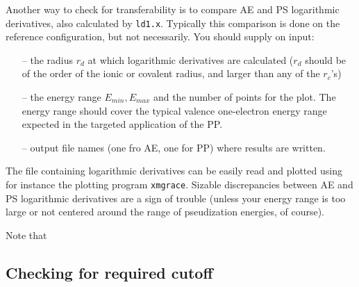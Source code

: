 

Another way to check for transferability is to compare AE and PS 
logarithmic derivatives, also calculated by {\tt ld1.x}. Typically 
this comparison is done on the reference configuration,
but not necessarily. You should supply on input:
\begin{enumerate}
\item[--] the radius $r_d$ at which logarithmic derivatives are 
          calculated ($r_d$ should be of the order of the
          ionic or covalent radius, and larger than any of the $r_c$'s)
\item[--] the energy range $E_{min}, E_{max}$ and the number 
          of points for the plot. The energy range
          should cover the typical valence one-electron energy 
          range expected in the targeted application of the PP. 
\item[--] output file names (one fro AE, one for PP) where results 
          are written.
\end{enumerate}
The file containing logarithmic derivatives can be easily read and 
plotted using for instance the plotting program {\tt xmgrace}. 
Sizable discrepancies between AE and PS logarithmic derivatives 
are a sign of trouble (unless your energy range is too large or 
not centered around the range of pseudization energies, of course).

Note that 
\subsection{Checking for required cutoff}

